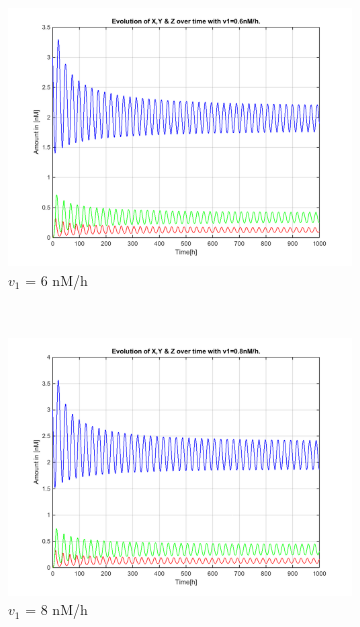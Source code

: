 \documentclass[10pt,a4paper,oneside,twocolumn]{article}
\numberwithin{equation}{section} %
\begin{document}
\begin{figure}
\begin{subfigure}[b]{0.32\textwidth}
	    \includegraphics[width=\textwidth]{LotsofthesameA/A-A6.png}
	    \caption{$v_1$ = 6 nM/h}
	\end{subfigure}
	~ 
	\begin{subfigure}[b]{0.32\textwidth}
	    \includegraphics[width=\textwidth]{LotsofthesameA/A-A8.png}
	    \caption{$v_1$ = 8 nM/h}
	\end{subfigure}
	~
	\begin{subfigure}[b]{0.32\textwidth}

\end{subfigure}
\end{figure}
\end{document}
